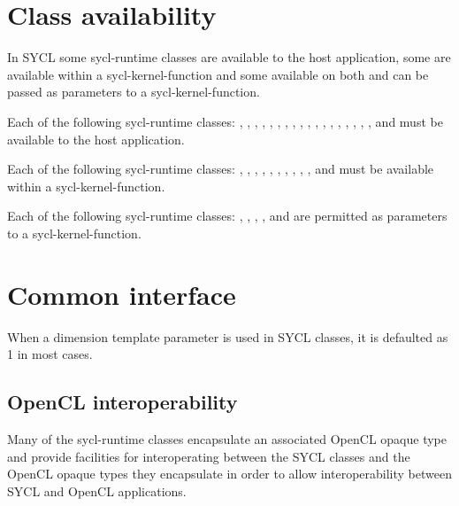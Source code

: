 \section{Class availability}

In SYCL some \gls{sycl-runtime} classes are available to the host application, some are 
available within a \gls{sycl-kernel-function} and some available on both and can
be passed as parameters to a \gls{sycl-kernel-function}.

Each of the following \gls{sycl-runtime} classes: ,
, , , , , , ,
, , , , , , ,
, , ,  and  must be available to the host application.

Each of the following \gls{sycl-runtime} classes: , , , ,  , , , , , ,  and 
must be available within a \gls{sycl-kernel-function}.

Each of the following \gls{sycl-runtime} classes: , , , ,  and  are permitted as parameters to a \gls{sycl-kernel-function}.

\section{Common interface}

When a dimension template parameter is used in SYCL classes, it is
defaulted as 1 in most cases.

\subsection{OpenCL interoperability}
\label{sec:opencl-interoperability}

Many of the \gls{sycl-runtime} classes encapsulate an associated OpenCL opaque type and provide facilities for interoperating between the SYCL classes and the OpenCL opaque types they encapsulate in order to allow interoperability between SYCL and OpenCL applications.

